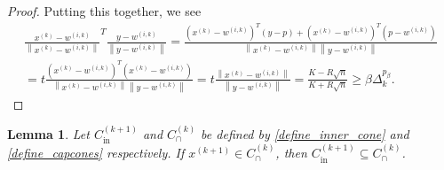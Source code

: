 \documentclass{article}
\newtheorem{lemma}[theorem]{Lemma}
\theoremstyle{case}
\numberwithin{theorem}{subsection}
\newcommand{\capcones}{{C^{(k)}_{\cap}}}
\newcommand{\dk}{\Delta_k}
\newcommand{\fcki}{{C^{(k+1)}_{\textrm{in}}}}
\newcommand{\wik}{{w^{(i, k)}}}
\newcommand{\xkpo}{{{x}^{(k+1)}}}
\newcommand{\xk}{x^{(k)}}
\begin{document}
\begin{proof}
Putting this together, we see
\begin{align*}
\frac{\xk - \wik}{\left\|\xk - \wik\right\|}^T\frac{y - \wik}{\left\|y - \wik\right\|} 
= \frac{\left(\xk - \wik\right) ^T\left(y - p\right) + \left(\xk - \wik\right)^T\left(p - \wik\right)}{\left\|\xk - \wik\right\|\left\|y - \wik\right\|} \\
= t\frac{\left(\xk - \wik\right)^T\left(\xk - \wik\right)}{\left\|\xk - \wik\right\|\left\|y - \wik\right\|}
= t \frac{\left\|\xk - \wik\right\|}{\left\|y - \wik\right\|}
= \frac {K - R\sqrt{n}}{K + R\sqrt{n}} \ge \beta \dk^{p_{\beta}}.
\end{align*}
\end{proof}

\begin{lemma}
\label{inner_cone_inside_each_cone}
Let $\fcki$ and $\capcones$ be defined by \cref{define_inner_cone} and \cref{define_capcones} respectively.
If 
$\xkpo \in \capcones$, then $\fcki \subseteq \capcones$.
\end{lemma}
\end{document}
